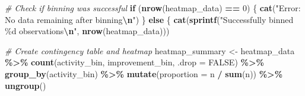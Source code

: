 \documentclass[
]{article}
\newenvironment{Shaded}{\begin{snugshade}}{\end{snugshade}}
\newcommand{\AttributeTok}[1]{\textcolor[rgb]{0.13,0.29,0.53}{#1}}
\newcommand{\CommentTok}[1]{\textcolor[rgb]{0.56,0.35,0.01}{\textit{#1}}}
\newcommand{\ConstantTok}[1]{\textcolor[rgb]{0.56,0.35,0.01}{#1}}
\newcommand{\ControlFlowTok}[1]{\textcolor[rgb]{0.13,0.29,0.53}{\textbf{#1}}}
\newcommand{\DecValTok}[1]{\textcolor[rgb]{0.00,0.00,0.81}{#1}}
\newcommand{\FunctionTok}[1]{\textcolor[rgb]{0.13,0.29,0.53}{\textbf{#1}}}
\newcommand{\NormalTok}[1]{#1}
\newcommand{\OtherTok}[1]{\textcolor[rgb]{0.56,0.35,0.01}{#1}}
\newcommand{\SpecialCharTok}[1]{\textcolor[rgb]{0.81,0.36,0.00}{\textbf{#1}}}
\newcommand{\StringTok}[1]{\textcolor[rgb]{0.31,0.60,0.02}{#1}}
\begin{document}
\begin{Shaded}
\begin{Highlighting}[]
                \CommentTok{\# Check if binning was successful}
                \ControlFlowTok{if}\NormalTok{ (}\FunctionTok{nrow}\NormalTok{(heatmap\_data) }\SpecialCharTok{==} \DecValTok{0}\NormalTok{) \{}
                    \FunctionTok{cat}\NormalTok{(}\StringTok{"Error: No data remaining after binning}\SpecialCharTok{\textbackslash{}n}\StringTok{"}\NormalTok{)}
\NormalTok{                \} }\ControlFlowTok{else}\NormalTok{ \{}
                    \FunctionTok{cat}\NormalTok{(}\FunctionTok{sprintf}\NormalTok{(}\StringTok{"Successfully binned \%d observations}\SpecialCharTok{\textbackslash{}n}\StringTok{"}\NormalTok{, }\FunctionTok{nrow}\NormalTok{(heatmap\_data)))}

                    \CommentTok{\# Create contingency table and heatmap}
\NormalTok{                    heatmap\_summary }\OtherTok{\textless{}{-}}\NormalTok{ heatmap\_data }\SpecialCharTok{\%\textgreater{}\%}
                        \FunctionTok{count}\NormalTok{(activity\_bin, improvement\_bin, }\AttributeTok{.drop =} \ConstantTok{FALSE}\NormalTok{) }\SpecialCharTok{\%\textgreater{}\%}
                        \FunctionTok{group\_by}\NormalTok{(activity\_bin) }\SpecialCharTok{\%\textgreater{}\%}
                        \FunctionTok{mutate}\NormalTok{(}\AttributeTok{proportion =}\NormalTok{ n }\SpecialCharTok{/} \FunctionTok{sum}\NormalTok{(n)) }\SpecialCharTok{\%\textgreater{}\%}
                        \FunctionTok{ungroup}\NormalTok{()}


\end{Highlighting}
\end{Shaded}
\end{document}

